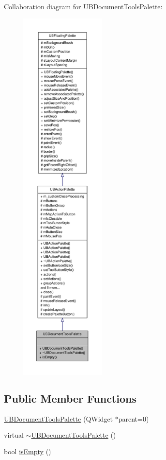Collaboration diagram for U\-B\-Document\-Tools\-Palette\-:
\nopagebreak
\begin{figure}[H]
\begin{center}
\leavevmode
\includegraphics[height=550pt]{db/db1/class_u_b_document_tools_palette__coll__graph}
\end{center}
\end{figure}
\subsection*{Public Member Functions}
\begin{DoxyCompactItemize}
\item 
\hyperlink{class_u_b_document_tools_palette_a7ab0340a34c2d179c21eeb1cbe3bfc49}{U\-B\-Document\-Tools\-Palette} (Q\-Widget $\ast$parent=0)
\item 
virtual \hyperlink{class_u_b_document_tools_palette_acd8f35ba1fbe35fc11e0f1e8fc0e90c3}{$\sim$\-U\-B\-Document\-Tools\-Palette} ()
\item 
bool \hyperlink{class_u_b_document_tools_palette_a1e3c9893bdad8b3eb8c816327fc5adb7}{is\-Empty} ()
\end{DoxyCompactItemize}

